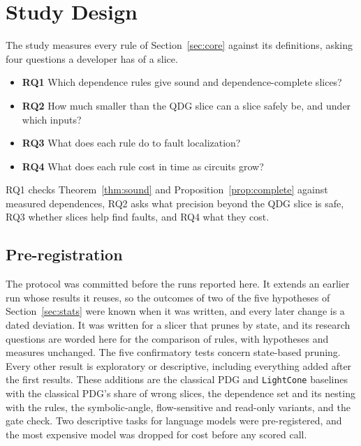 \section{Study Design}\label{sec:design}

The study measures every rule of Section~\ref{sec:core} against its definitions, asking four questions a developer
has of a slice.

\begin{itemize}
\item \textbf{RQ1} Which dependence rules give sound and dependence-complete slices?
\item \textbf{RQ2} How much smaller than the QDG slice can a slice safely be, and under which inputs?
\item \textbf{RQ3} What does each rule do to fault localization?
\item \textbf{RQ4} What does each rule cost in time as circuits grow?
\end{itemize}

RQ1 checks Theorem~\ref{thm:sound} and Proposition~\ref{prop:complete} against measured dependences, RQ2 asks what
precision beyond the QDG slice is safe, RQ3 whether slices help find faults, and RQ4 what they cost.

\subsection{Pre-registration}
The protocol was committed before the runs reported here. It extends an earlier run whose results it reuses, so the
outcomes of two of the five hypotheses of Section~\ref{sec:stats} were known when it was written, and every later change is a dated deviation. It was
written for a slicer that prunes by state, and its research questions are worded here for the comparison of rules,
with hypotheses and measures unchanged. The five confirmatory tests concern state-based pruning. Every other result is exploratory or descriptive,
including everything added after the first results. These additions are the classical PDG and
\texttt{LightCone} baselines with the classical PDG's share of wrong slices, the dependence set and its nesting with
the rules, the symbolic-angle, flow-sensitive and read-only variants, and the gate check. Two descriptive tasks for language models were pre-registered, and the most
expensive model was dropped for cost before any scored call.

